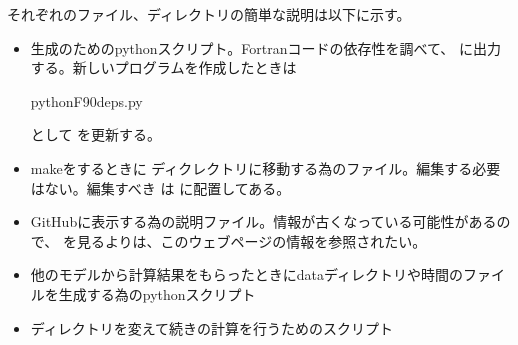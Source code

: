 \documentclass[letterpaper,10pt,dvipdfmx,report]{sphinxmanual}
\begin{document}
\sphinxAtStartPar
それぞれのファイル、ディレクトリの簡単な説明は以下に示す。
\begin{itemize}
\item {} \begin{description}
\sphinxAtStartPar
{} 生成のためのpythonスクリプト。Fortranコードの依存性を調べて、 に出力する。新しいプログラムを作成したときは

\begin{sphinxVerbatim}[commandchars=\\\{\}]
pythonF90\PYGZus{}deps.py
\end{sphinxVerbatim}

\sphinxAtStartPar
として  を更新する。

\end{description}

\item {} \begin{description}
\sphinxAtStartPar
makeをするときに  ディクレクトリに移動する為のファイル。編集する必要はない。編集すべき  は  に配置してある。

\end{description}

\item {} \begin{description}
\sphinxAtStartPar
GitHubに表示する為の説明ファイル。情報が古くなっている可能性があるので、  を見るよりは、このウェブページの情報を参照されたい。

\end{description}

\item {} \begin{description}
\sphinxAtStartPar
他のモデルから計算結果をもらったときにdataディレクトリや時間のファイルを生成する為のpythonスクリプト

\end{description}

\item {} \begin{description}
\sphinxAtStartPar
ディレクトリを変えて続きの計算を行うためのスクリプト


\end{description}
\end{itemize}
\end{document}
